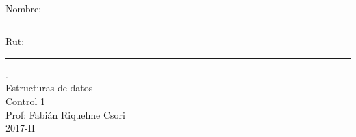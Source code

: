 \documentclass[letter,12pt,oneside]{book}
\theoremstyle{definition}
\begin{document}

\begin{center}
$~$
\end{center}

\noindent
Nombre: \rule{.6\textwidth}{.5pt} Rut: \rule{.24\textwidth}{.5pt}

\begin{center}
 {\Large
  {\color{white}.}\\
  Estructuras de datos\\[1ex]
  Control 1}\\[1.2ex]
  Prof: Fabián Riquelme Csori\\
  2017-II
\end{center}
\end{document}
